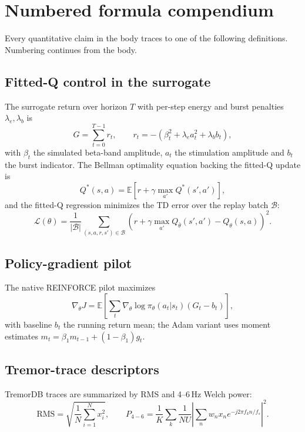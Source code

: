 \appendix
\section{Numbered formula compendium}
Every quantitative claim in the body traces to one of the following definitions. Numbering continues from the body.
\subsection{Fitted-Q control in the surrogate}
The surrogate return over horizon $T$ with per-step energy and burst penalties $\lambda_e, \lambda_b$ is
\begin{equation} G = \sum_{t=0}^{T-1} r_t, \qquad r_t = -\left( \beta_t^2 + \lambda_e a_t^2 + \lambda_b b_t \right), \end{equation}
with $\beta_t$ the simulated beta-band amplitude, $a_t$ the stimulation amplitude and $b_t$ the burst indicator. The Bellman optimality equation backing the fitted-Q update is
\begin{equation} Q^*(s,a) = \mathbb{E}\left[ r + \gamma \max_{a'} Q^*(s',a') \right], \end{equation}
and the fitted-Q regression minimizes the TD error over the replay batch $\mathcal{B}$:
\begin{equation} \mathcal{L}(\theta) = \frac{1}{|\mathcal{B}|} \sum_{(s,a,r,s')\in\mathcal{B}} \left( r + \gamma \max_{a'} Q_{\bar\theta}(s',a') - Q_\theta(s,a) \right)^2. \end{equation}
\subsection{Policy-gradient pilot}
The native REINFORCE pilot maximizes
\begin{equation} \nabla_\theta J = \mathbb{E}\left[ \sum_t \nabla_\theta \log \pi_\theta(a_t|s_t) \left( G_t - b_t \right) \right], \end{equation}
with baseline $b_t$ the running return mean; the Adam variant uses moment estimates $m_t = \beta_1 m_{t-1} + (1-\beta_1) g_t$.
\subsection{Tremor-trace descriptors}
TremorDB traces are summarized by RMS and 4--6\,Hz Welch power:
\begin{equation} \mathrm{RMS} = \sqrt{\frac{1}{N}\sum_{i=1}^{N} x_i^2}, \qquad P_{4-6} = \frac{1}{K}\sum_k \frac{1}{N U}\left| \sum_n w_n x_n e^{-j 2\pi f_k n / f_s} \right|^2. \end{equation}
